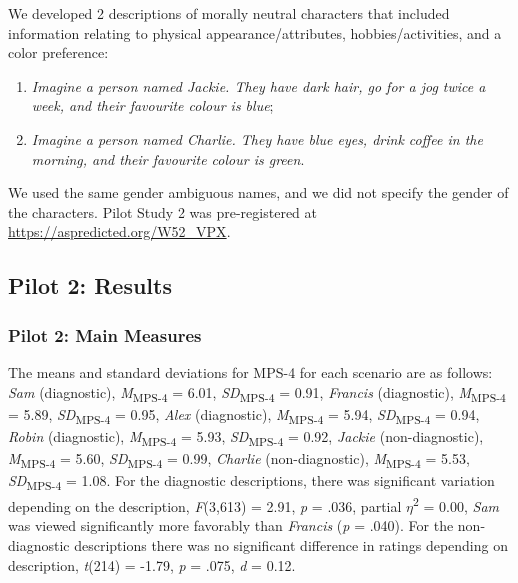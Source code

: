 \documentclass[
  man,floatsintext]{apa6}
\providecommand{\tightlist}{%
  \setlength{\itemsep}{0pt}\setlength{\parskip}{0pt}}
\begin{document}
We developed 2 descriptions of morally neutral characters that included information relating to physical appearance/attributes, hobbies/activities, and a color preference:

\begin{enumerate}
\def\labelenumi{(\roman{enumi})}
\tightlist
\item
  \emph{Imagine a person named Jackie. They have dark hair, go for a jog twice a week, and their favourite colour is blue};
\item
  \emph{Imagine a person named Charlie. They have blue eyes, drink coffee in the morning, and their favourite colour is green}.
\end{enumerate}

We used the same gender ambiguous names, and we did not specify the gender of the characters. Pilot Study 2 was pre-registered at \color{blue}\url{https://aspredicted.org/W52_VPX}\color{black}.

\subsection{Pilot 2: Results}\label{pilot-2-results}

\subsubsection{Pilot 2: Main Measures}\label{pilot-2-main-measures}

The means and standard deviations for MPS-4 for each scenario are as follows:
\emph{Sam} (diagnostic),
\emph{M}\textsubscript{MPS-4} = 6.01, \emph{SD}\textsubscript{MPS-4} = 0.91,
\emph{Francis} (diagnostic),
\emph{M}\textsubscript{MPS-4} = 5.89, \emph{SD}\textsubscript{MPS-4} = 0.95,
\emph{Alex} (diagnostic),
\emph{M}\textsubscript{MPS-4} = 5.94, \emph{SD}\textsubscript{MPS-4} = 0.94,
\emph{Robin} (diagnostic),
\emph{M}\textsubscript{MPS-4} = 5.93, \emph{SD}\textsubscript{MPS-4} = 0.92,
\emph{Jackie} (non-diagnostic),
\emph{M}\textsubscript{MPS-4} = 5.60, \emph{SD}\textsubscript{MPS-4} = 0.99,
\emph{Charlie} (non-diagnostic),
\emph{M}\textsubscript{MPS-4} = 5.53, \emph{SD}\textsubscript{MPS-4} = 1.08. For the diagnostic descriptions, there was significant variation depending on the description, \emph{F}(3,613) = 2.91, \emph{p} = .036, partial \(\eta\)\textsuperscript{2} = 0.00, \emph{Sam} was viewed significantly more favorably than \emph{Francis} (\emph{p} = .040). For the non-diagnostic descriptions there was no significant difference in ratings depending on description, \emph{t}(214) = -1.79, \emph{p} = .075, \emph{d} = 0.12.
\end{document}
